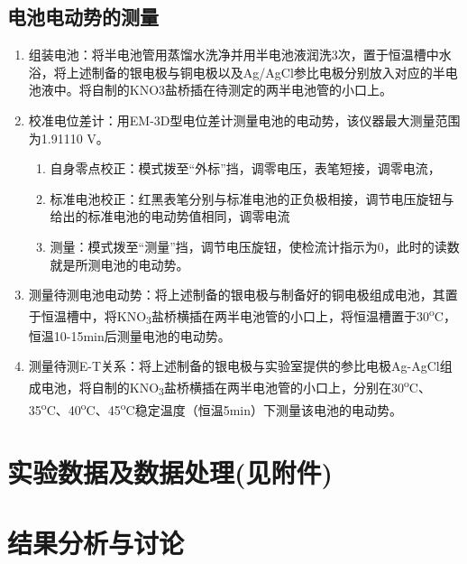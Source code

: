 \documentclass[11pt]{report}
\begin{document}
\section{电池电动势的测量}
\label{sec:org09429c3}
\begin{enumerate}
\item 组装电池：将半电池管用蒸馏水洗净并用半电池液润洗3次，置于恒温槽中水浴，将上述制备的银电极与铜电极以及Ag/AgCl参比电极分别放入对应的半电池液中。将自制的KNO3盐桥插在待测定的两半电池管的小口上。
\item 校准电位差计：用EM-3D型电位差计测量电池的电动势，该仪器最大测量范围为1.91110 V。
\begin{enumerate}
\item 自身零点校正：模式拨至“外标”挡，调零电压，表笔短接，调零电流，
\item 标准电池校正：红黑表笔分别与标准电池的正负极相接，调节电压旋钮与给出的标准电池的电动势值相同，调零电流
\item 测量：模式拨至“测量”挡，调节电压旋钮，使检流计指示为0，此时的读数就是所测电池的电动势。
\end{enumerate}
\item 测量待测电池电动势：将上述制备的银电极与制备好的铜电极组成电池，其置于恒温槽中，将KNO\textsubscript{3}盐桥横插在两半电池管的小口上，将恒温槽置于30\textsuperscript{o}C，恒温10-15min后测量电池的电动势。
\item 测量待测E-T关系：将上述制备的银电极与实验室提供的参比电极Ag-AgCl组成电池，将自制的KNO\textsubscript{3}盐桥横插在两半电池管的小口上，分别在30\textsuperscript{o}C、35\textsuperscript{o}C、40\textsuperscript{o}C、45\textsuperscript{o}C稳定温度（恒温5min）下测量该电池的电动势。
\end{enumerate}
\chapter{实验数据及数据处理(见附件)}
\label{sec:org7141ad8}
\chapter{结果分析与讨论}
\label{sec:org35e01c1}
\end{document}
